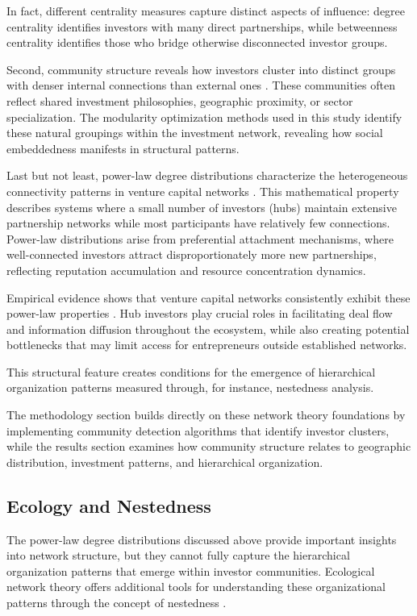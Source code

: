 In fact, different centrality measures capture distinct aspects of influence: degree centrality identifies investors with many direct partnerships, while betweenness centrality identifies those who bridge otherwise disconnected investor groups.

Second, community structure reveals how investors cluster into distinct groups with denser internal connections than external ones \cite{Theophile2024}. These communities often reflect shared investment philosophies, geographic proximity, or sector specialization. The modularity optimization methods used in this study identify these natural groupings within the investment network, revealing how social embeddedness manifests in structural patterns.

Last but not least, power-law degree distributions characterize the heterogeneous connectivity patterns in venture capital networks \cite{Bygrave1987}. This mathematical property describes systems where a small number of investors (hubs) maintain extensive partnership networks while most participants have relatively few connections. Power-law distributions arise from preferential attachment mechanisms, where well-connected investors attract disproportionately more new partnerships, reflecting reputation accumulation and resource concentration dynamics.

Empirical evidence shows that venture capital networks consistently exhibit these power-law properties \cite{Dalle2025}. Hub investors play crucial roles in facilitating deal flow and information diffusion throughout the ecosystem, while also creating potential bottlenecks that may limit access for entrepreneurs outside established networks. 

This structural feature creates conditions for the emergence of hierarchical organization patterns measured through, for instance, nestedness analysis.

The methodology section builds directly on these network theory foundations by implementing community detection algorithms that identify investor clusters, while the results section examines how community structure relates to geographic distribution, investment patterns, and hierarchical organization.

\subsection{Ecology and Nestedness}

The power-law degree distributions discussed above provide important insights into network structure, but they cannot fully capture the hierarchical organization patterns that emerge within investor communities. Ecological network theory offers additional tools for understanding these organizational patterns through the concept of nestedness \cite{Mariani2019}.

